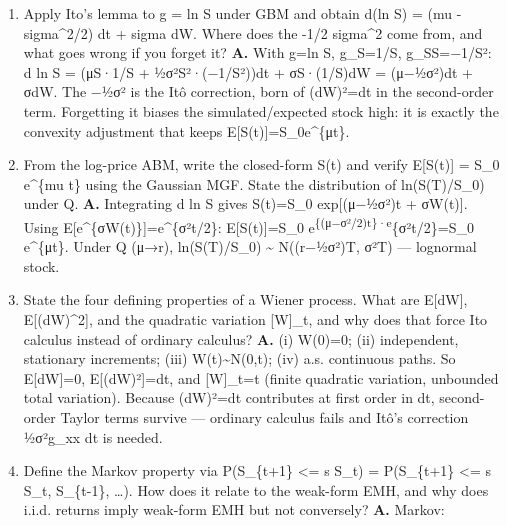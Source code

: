 \documentclass[
  11pt,
]{article}
\begin{document}
\begin{enumerate}
  fail for puts? \textbf{A.} The portfolio (long call + bond worth
  Ke\^{}\{-r(T-t)\}) pays max(S\_T,K)≥S\_T at T, so it costs ≥ S(t)
  today: C(t) ≥ S(t)−Ke\^{}\{-r(T-t)\}, and ≥0, hence the bound. For
  r\textgreater0 this exceeds intrinsic S(t)−K, so the live call beats
  immediate exercise and American = European. For the put, parity gives
  P\^{}eur = Ke\textsuperscript{\{-r(T-t)\}−S+C}eur and
  Ke\^{}\{-r(T-t)\}\textless K, so the live put can be \emph{below}
  intrinsic K−S --- banking K early to earn interest can win, so early
  exercise is genuinely optimal.
\item
  Apply Ito's lemma to g = ln S under GBM and obtain d(ln S) = (mu -
  sigma\^{}2/2) dt + sigma dW. Where does the -1/2 sigma\^{}2 come from,
  and what goes wrong if you forget it? \textbf{A.} With g=ln S,
  g\_S=1/S, g\_SS=−1/S²: d ln S = (μS·1/S + ½σ²S²·(−1/S²))dt +
  σS·(1/S)dW = (μ−½σ²)dt + σdW. The −½σ² is the Itô correction, born of
  (dW)²=dt in the second-order term. Forgetting it biases the
  simulated/expected stock high: it is exactly the convexity adjustment
  that keeps E{[}S(t){]}=S\_0e\^{}\{μt\}.
\item
  From the log-price ABM, write the closed-form S(t) and verify
  E{[}S(t){]} = S\_0 e\^{}\{mu t\} using the Gaussian MGF. State the
  distribution of ln(S(T)/S\_0) under Q. \textbf{A.} Integrating d ln S
  gives S(t)=S\_0 exp{[}(μ−½σ²)t + σW(t){]}. Using
  E{[}e\^{}\{σW(t)\}{]}=e\^{}\{σ²t/2\}: E{[}S(t){]}=S\_0
  e\textsuperscript{\{(μ−σ²/2)t\}·e}\{σ²t/2\}=S\_0 e\^{}\{μt\}. Under Q
  (μ→r), ln(S(T)/S\_0) \textasciitilde{} N((r−½σ²)T, σ²T) --- lognormal
  stock.
\item
  State the four defining properties of a Wiener process. What are
  E{[}dW{]}, E{[}(dW)\^{}2{]}, and the quadratic variation {[}W{]}\_t,
  and why does that force Ito calculus instead of ordinary calculus?
  \textbf{A.} (i) W(0)=0; (ii) independent, stationary increments; (iii)
  W(t)\textasciitilde N(0,t); (iv) a.s. continuous paths. So
  E{[}dW{]}=0, E{[}(dW)²{]}=dt, and {[}W{]}\_t=t (finite quadratic
  variation, unbounded total variation). Because (dW)²=dt contributes at
  first order in dt, second-order Taylor terms survive --- ordinary
  calculus fails and Itô's correction ½σ²g\_xx dt is needed.
\item
  Define the Markov property via P(S\_\{t+1\} \textless= s \textbar{}
  S\_t) = P(S\_\{t+1\} \textless= s \textbar{} S\_t, S\_\{t-1\},
  \ldots). How does it relate to the weak-form EMH, and why does i.i.d.
  returns imply weak-form EMH but not conversely? \textbf{A.} Markov:

\end{enumerate}
\end{document}
